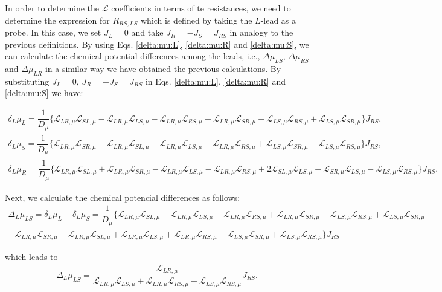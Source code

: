 In order to determine the $\mathcal{L}$ coefficients in terms of te resistances, we need to determine the expression for $R_{RS,LS}$ which is defined by taking the $L$-lead as a probe. In this case, we set $J_{L}=0$ and take $J_{R}=-J_{S}=J_{RS}$ in analogy to the previous definitions. By using Eqs. \eqref{delta:mu:L}, \eqref{delta:mu:R} and \eqref{delta:mu:S}, we can calculate the chemical potential differences among the leads, i.e., $\Delta\mu_{LS}$, $\Delta\mu_{RS}$ and $\Delta\mu_{LR}$ in a similar way we have obtained the previous calculations. By substituting $J_{L}=0$, $J_{R}=-J_{S}=J_{RS}$ in Eqs. \eqref{delta:mu:L}, \eqref{delta:mu:R} and \eqref{delta:mu:S} we have:
\begin{widetext}
\begin{align}\label{deltaL:mu:L}
\delta_{L}\mu_{L}
=\dfrac{1}{D_{\mu}}
\{
\mathcal{L}_{LR,\mu}\mathcal{L}_{SL,\mu}
-
\mathcal{L}_{LR,\mu}\mathcal{L}_{LS,\mu}
-
\mathcal{L}_{LR,\mu}\mathcal{L}_{RS,\mu}
+
\mathcal{L}_{LR,\mu}\mathcal{L}_{SR,\mu}
-
\mathcal{L}_{LS,\mu}\mathcal{L}_{RS,\mu}
+
\mathcal{L}_{LS,\mu}\mathcal{L}_{SR,\mu}
\}J_{RS},
\end{align}  
\begin{align}\label{deltaL:mu:S}
\delta_{L}\mu_{S}
=\dfrac{1}{D_{\mu}}
\{
\mathcal{L}_{LR,\mu}\mathcal{L}_{SR,\mu}
-
\mathcal{L}_{LR,\mu}\mathcal{L}_{SL,\mu}
-
\mathcal{L}_{LR,\mu}\mathcal{L}_{LS,\mu}
-
\mathcal{L}_{LR,\mu}\mathcal{L}_{RS,\mu}
+
\mathcal{L}_{LS,\mu}\mathcal{L}_{SR,\mu}
-
\mathcal{L}_{LS,\mu}\mathcal{L}_{RS,\mu}
\}J_{RS},
\end{align} 
\begin{align}\label{deltaL:mu:R}
\delta_{L}\mu_{R}
=\dfrac{1}{D_{\mu}}
\{
\mathcal{L}_{LR,\mu}\mathcal{L}_{SL,\mu}
+
\mathcal{L}_{LR,\mu}\mathcal{L}_{SR,\mu}
-
\mathcal{L}_{LR,\mu}\mathcal{L}_{LS,\mu}
-
\mathcal{L}_{LR,\mu}\mathcal{L}_{RS,\mu}
+2
\mathcal{L}_{SL,\mu}\mathcal{L}_{LS,\mu}
+
\mathcal{L}_{SR,\mu}\mathcal{L}_{LS,\mu}
-
\mathcal{L}_{LS,\mu}\mathcal{L}_{RS,\mu}
\}J_{RS}.
\end{align}

Next, we calculate the chemical potencial differences as follows:
\begin{align*}
\Delta_{L}\mu_{LS}
=
\delta_{L}\mu_{L}-\delta_{L}\mu_{S}
=
\dfrac{1}{D_{\mu}}
\{
\mathcal{L}_{LR,\mu}\mathcal{L}_{SL,\mu}
-
\mathcal{L}_{LR,\mu}\mathcal{L}_{LS,\mu}
-
\mathcal{L}_{LR,\mu}\mathcal{L}_{RS,\mu}
+
\mathcal{L}_{LR,\mu}\mathcal{L}_{SR,\mu}
-
\mathcal{L}_{LS,\mu}\mathcal{L}_{RS,\mu}
+
\mathcal{L}_{LS,\mu}\mathcal{L}_{SR,\mu}
\\
-
\mathcal{L}_{LR,\mu}\mathcal{L}_{SR,\mu}
+
\mathcal{L}_{LR,\mu}\mathcal{L}_{SL,\mu}
+
\mathcal{L}_{LR,\mu}\mathcal{L}_{LS,\mu}
+
\mathcal{L}_{LR,\mu}\mathcal{L}_{RS,\mu}
-
\mathcal{L}_{LS,\mu}\mathcal{L}_{SR,\mu}
+
\mathcal{L}_{LS,\mu}\mathcal{L}_{RS,\mu}
\}J_{RS}
\end{align*}
\end{widetext}
which leads to
\begin{align}\label{LDeltaLS:eq1}
\Delta_{L}\mu_{LS}
=
\dfrac{\mathcal{L}_{LR,\mu}}{\mathcal{L}_{LR,\mu} \mathcal{L}_{LS,\mu} +\mathcal{L}_{LR,\mu} \mathcal{L}_{RS,\mu}+\mathcal{L}_{LS,\mu} \mathcal{L}_{RS,\mu} }
J_{RS}.
\end{align}

